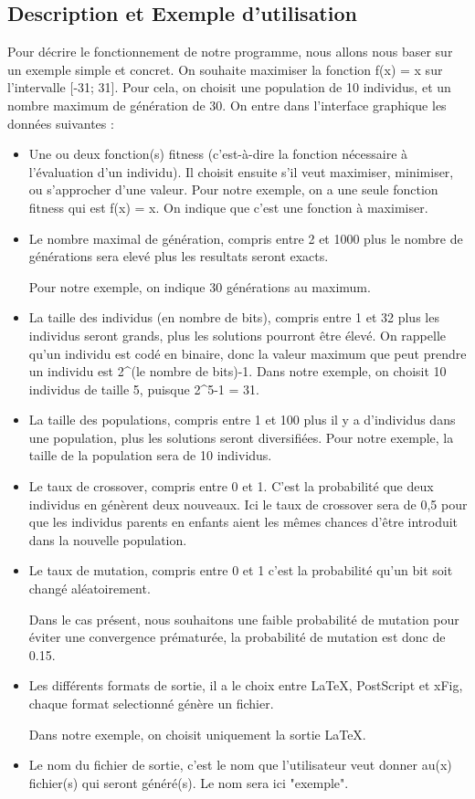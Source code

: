 \documentclass[a4paper,11pt]{article}
\begin{document}
		\subsection{Description et Exemple d’utilisation}
			Pour décrire le fonctionnement de notre programme, nous allons nous baser sur un exemple simple et concret.
			On souhaite maximiser la fonction f(x) = x sur l'intervalle [-31; 31].
			Pour cela, on choisit une population de 10 individus, et un nombre maximum de génération de 30.
			On entre dans l’interface graphique les données suivantes :\\
				\begin{itemize}
					\item	Une ou deux fonction(s) fitness (c’est-à-dire la fonction nécessaire à l’évaluation d’un individu). 
							Il choisit ensuite s’il veut maximiser, minimiser, ou s’approcher d’une valeur. 
							Pour notre exemple, on a une seule fonction fitness qui est f(x) = x. On indique que c’est une fonction à maximiser.

					\item 	Le nombre maximal de génération, compris entre 2 et 1000 plus le nombre de générations sera elevé plus les resultats seront exacts. 
				
							Pour notre exemple, on indique 30 générations au maximum.		
					\item	La taille des individus (en nombre de bits), compris entre 1 et 32 plus les individus seront grands, plus les solutions pourront être élevé.
							On rappelle qu’un individu est codé en binaire, donc la valeur maximum que peut prendre un individu est 2\^{}(le nombre de bits)-1.
							Dans notre exemple, on choisit 10 individus de taille 5, puisque 2\^{}5-1 = 31. 
					\item	La taille des populations, compris entre 1 et 100 plus il y a d'individus dans une population, plus les solutions seront diversifiées.
							Pour notre exemple, la taille de la population sera de 10 individus.
					\item	Le taux de crossover, compris entre 0 et 1. C'est la probabilité que deux individus en génèrent deux nouveaux.
							Ici le taux de crossover sera de 0,5 pour que les individus parents en enfants aient les mêmes chances d'être introduit dans la nouvelle population.
					\item	Le taux de mutation, compris entre 0 et 1 c'est la probabilité qu'un bit soit changé aléatoirement.

							Dans le cas présent, nous souhaitons une faible probabilité de mutation pour éviter une convergence prématurée, la probabilité de mutation est donc de 0.15.
					\item	Les différents formats de sortie, il a le choix entre LaTeX, PostScript et xFig, chaque format selectionné génère un fichier.

							Dans notre exemple, on choisit uniquement la sortie LaTeX.
					\item	Le nom du fichier de sortie, c'est le nom que l'utilisateur veut donner au(x) fichier(s) qui seront généré(s).
							Le nom sera ici "exemple".\\
					\end{itemize}
\end{document}

